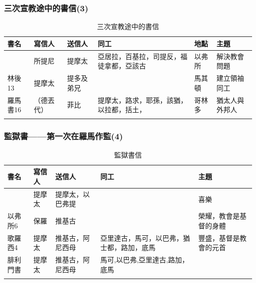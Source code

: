 \vspace*{-\baselineskip}
\subsubsection{三次宣教途中的書信(3)}
\vspace*{-\baselineskip}
\def\rowi  {林前16 & 所提尼 & 提摩太 &亞居拉，百基拉，司提反，福徒拿都，亞該古&以弗所&解決教會問題\\}
\def\rowii  {林後13 &提摩太 & 提多及弟兄 &&馬其頓&建立領袖同工\\}
\def\rowiii{羅馬書16 & （德丟代） & 菲比&提摩太，路求，耶孫，該猶，以拉都，括土， &哥林多&猶太人與外邦人\\}
\begin{table}[!hbp]
\begin{tabular}{llllll}
\toprule
書名 & 寫信人 & 送信人&同工&地點&主題\\
\midrule
\sortfirstcol{\rowi\rowii\rowiii}
\bottomrule
\end{tabular}
\caption{三次宣教途中的書信}
\end{table}

\subsubsection{監獄書——第一次在羅馬作監(4)}
\vspace*{-\baselineskip}
\def\rowi{腓立比4 & 提摩太& 提摩太，以巴弗提&&喜樂\\}
\def\rowii{以弗所6 & 保羅& 推基古&&榮耀，教會是基督的身體 \\}
\def\rowiii{歌羅西4 & 提摩太&推基古，阿尼西母 &亞里達古，馬可，以巴弗，猶士都，路加，底馬&豐盛，基督是教會的元首 \\}
\def\rowiv{腓利門書 & 提摩太 &推基古，阿尼西母&馬可,以巴弗,亞里達古,路加，底馬&\\}
\begin{table}[!hbp]
\begin{tabular}{lllll}
\toprule
書名 & 寫信人 & 送信人&同工&主題\\
\midrule
\sortfirstcol{\rowi\rowii\rowiii\rowiv}
\bottomrule
\end{tabular}
\caption{監獄書信}
\end{table}



